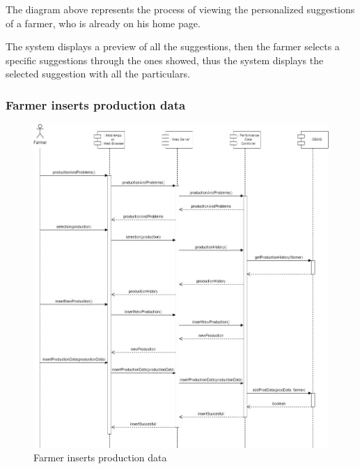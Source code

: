 \documentclass{article}
\begin{document}
        The diagram above represents the process of viewing the personalized suggestions of a farmer, who is already on his home page. \par
        The system displays a preview of all the suggestions, then the farmer selects a specific suggestions through the ones showed, thus the system displays the selected suggestion with all the particulars.
        
    
    \newpage
    
    
    \subsubsection{Farmer inserts production data}
        \begin{figure} [h]
            \centering
            \includegraphics[width=1\textwidth]{images/ArchitecturalDesign/RuntimeView/4. FarmerInsertProductionData.jpg}
            \caption{\label{fig:farmerInsertsProductionData}Farmer inserts production data}
        \end{figure}
        
\end{document}
